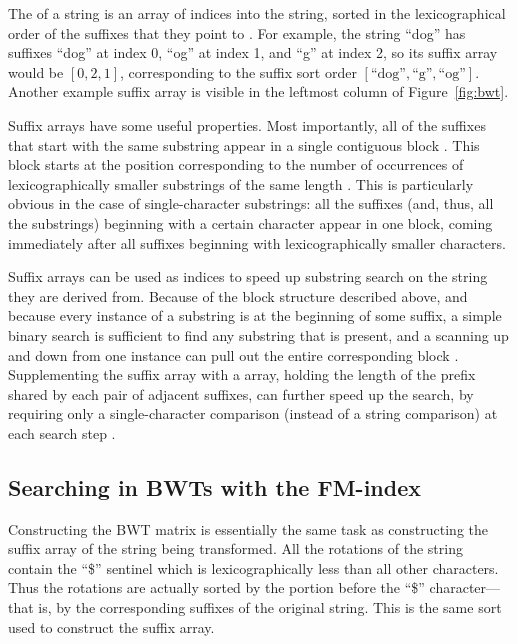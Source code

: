 The  of a string is an array of indices into the string, sorted in the lexicographical order of the suffixes that they point to \cite{manber1993suffix}. For example, the string ``dog'' has suffixes ``dog'' at index 0, ``og'' at index 1, and ``g'' at index 2, so its suffix array would be $[0, 2, 1]$, corresponding to the suffix sort order $[\textrm{``dog''}, \textrm{``g''}, \textrm{``og''}]$. Another example suffix array is visible in the leftmost column of Figure~\ref{fig:bwt}.

Suffix arrays have some useful properties. Most importantly, all of the suffixes that start with the same substring appear in a single contiguous block \cite{ferragina2000opportunistic}. This block starts at the position corresponding to the number of occurrences of lexicographically smaller substrings of the same length \cite{ferragina2000opportunistic}. This is particularly obvious in the case of single-character substrings: all the suffixes (and, thus, all the substrings) beginning with a certain character appear in one block, coming immediately after all suffixes beginning with lexicographically smaller characters.

Suffix arrays can be used as indices to speed up substring search on the string they are derived from. Because of the block structure described above, and because every instance of a substring is at the beginning of some suffix, a simple binary search is sufficient to find any substring that is present, and a scanning up and down from one instance can pull out the entire corresponding block \cite{manber1993suffix}. Supplementing the suffix array with a  array, holding the length of the prefix shared by each pair of adjacent suffixes, can further speed up the search, by requiring only a single-character comparison (instead of a string comparison) at each search step \cite{manber1993suffix}.
    
\subsection{Searching in BWTs with the FM-index}

Constructing the BWT matrix is essentially the same task as constructing the suffix array of the string being transformed. All the rotations of the string contain the ``\$'' sentinel which is lexicographically less than all other characters. Thus the rotations are actually sorted by the portion before the ``\$'' character---that is, by the corresponding suffixes of the original string. This is the same sort used to construct the suffix array.

